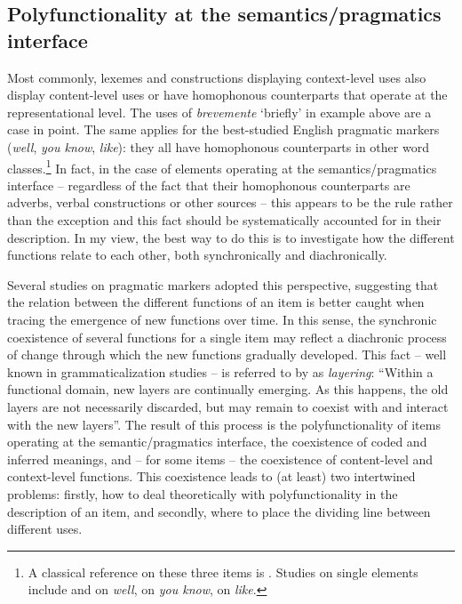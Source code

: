 \subsection{Polyfunctionality at the semantics/pragmatics interface}
\hypertarget{Toc124860630}{}
Most commonly, lexemes and constructions displaying context-level uses also display content-level uses or have homophonous counterparts that operate at the representational level. The uses of \textit{brevemente} ‘briefly’ in example  above are a case in point. The same applies for the best-studied English pragmatic markers (\textit{well}, \textit{you know}, \textit{like}): they all have homophonous counterparts in other word classes.\footnote{A classical reference on these three items is \citet{Schourup1985}. Studies on single elements include \citet{Jucker1993} and \citet{Schourup2001} on \textit{well}, \citet{Östman1981} on \textit{you know}, \citet{Arcy2017} on \textit{like}.} In fact, in the case of elements operating at the semantics/pragmatics interface – regardless of the fact that their homophonous counterparts are adverbs, verbal constructions or other sources – this appears to be the rule rather than the exception and this fact should be systematically accounted for in their description. In my view, the best way to do this is to investigate how the different functions relate to each other, both synchronically and diachronically.

Several studies on pragmatic markers adopted this perspective, suggesting that the relation between the different functions of an item is better caught when tracing the emergence of new functions over time. In this sense, the synchronic coexistence of several functions for a single item may reflect a diachronic process of change through which the new functions gradually developed. This fact – well known in grammaticalization studies – is referred to by \citet[22--23]{Hopper1991} as \textit{layering}: “Within a functional domain, new layers are continually emerging. As this happens, the old layers are not necessarily discarded, but may remain to coexist with and interact with the new layers”. The result of this process is the polyfunctionality of items operating at the semantic/pragmatics interface, the coexistence of coded and inferred meanings, and – for some items – the coexistence of content-level and context-level functions. This coexistence leads to (at least) two intertwined problems: firstly, how to deal theoretically with polyfunctionality in the description of an item, and secondly, where to place the dividing line between different uses.

